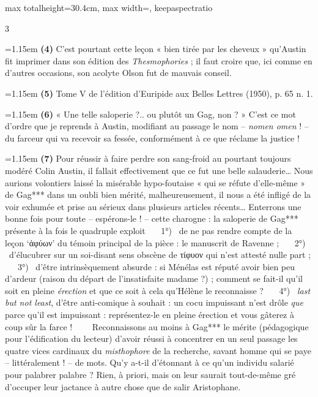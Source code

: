 \documentclass[11pt,twoside]{book}
\newcommand{\italique}[1]{\textit{#1}}
\newcommand{\latin}[1]{\textit{#1}}
\begin{document}
\begin{adjustbox}{max totalheight=30.4cm, max width=\textwidth, keepaspectratio}
\begin{minipage}{\textwidth}
{\begin{multicols}{3}
\par\vspace{1.5pt}
\noindent\hangindent=1.15em {\color{sepiaNote}\textbf{(4)}} C'est pourtant cette leçon « bien tirée par les cheveux » qu'Austin fit imprimer dans son édition des \italique{Thesmophories} ; il faut croire que, ici comme en d'autres occasions, son acolyte Olson fut de mauvais conseil.
\par\vspace{1.5pt}
\noindent\hangindent=1.15em {\color{sepiaNote}\textbf{(5)}} Tome V de l'édition d'Euripide aux Belles Lettres (1950), p. 65 n. 1.
\par\vspace{1.5pt}
\noindent\hangindent=1.15em {\color{sepiaNote}\textbf{(6)}} « Une telle saloperie ?.. ou plutôt un Gag, non ? » C'est ce mot d'ordre que je reprends à Austin, modifiant au passage le nom – \latin{nomen omen} ! – du farceur qui va recevoir sa fessée, conformément à ce que réclame la justice !
\par\vspace{1.5pt}
\noindent\hangindent=1.15em {\color{sepiaNote}\textbf{(7)}} Pour réussir à faire perdre son sang-froid au pourtant toujours modéré Colin Austin, il fallait effectivement que ce fut une belle salauderie… Nous aurions volontiers laissé la misérable hypo-foutaise « qui se réfute d'elle-même » de Gag*** dans un oubli bien mérité, malheureusement, il nous a été infligé de la voir exhumée et prise au sérieux dans plusieurs articles récents…  Enterrons une bonne fois pour toute -- espérons-le ! -- cette charogne : la saloperie de Gag*** présente à la fois le quadruple exploit \ \ \ 1°) \ de ne pas rendre compte de la leçon `ἀφύων' du témoin principal de la pièce : le manuscrit de Ravenne ; \ \ \ 2°) \ d'élucubrer sur un soi-disant sens obscène de τίφυον qui n'est attesté nulle part ; \ \ \ 3°) \ d'être intrinsèquement absurde : si Ménélas est réputé avoir bien peu d'ardeur (raison du départ de l'insatisfaite madame ?) ; comment se fait-il qu'il soit en pleine \italique{érection} et que ce soit à cela qu'Hélène le reconnaisse ? \ \ \ 4°) \ \italique{last but not least}, d'être anti-comique à souhait : un cocu impuissant n'est drôle \italique{que} parce qu'il est impuissant : représentez-le en pleine érection et vous gâterez à coup sûr la farce ! \ \ \ \ Reconnaissons au moins à Gag*** le mérite (pédagogique pour l'édification du lecteur) d'avoir réussi à concentrer en un seul passage les quatre vices cardinaux du \italique{misthophore} de la recherche, savant homme qui se paye – littéralement ! – de mots. Qu'y a-t-il d'étonnant à ce qu'un individu salarié pour palabrer palabre ? Rien, à priori, mais on leur saurait tout-de-même gré d'occuper leur jactance à autre chose que de salir Aristophane.

\end{multicols}}
\end{minipage}
\end{adjustbox}
\end{document}
